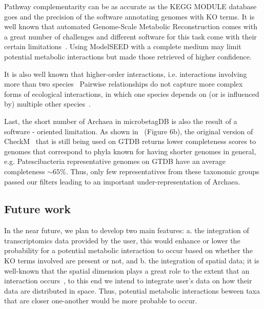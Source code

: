 \documentclass[sn-mathphys,Numbered]{sn-jnl}  %
\theoremstyle{thmstyleone}%
\theoremstyle{thmstyletwo}%
\theoremstyle{thmstylethree}%
\begin{document}
        Pathway complementarity can be as accurate as the KEGG MODULE database goes and the precision of the software annotating genomes with KO terms.
        It is well known that automated Genome-Scale Metabolic Reconstruction comes with a great number of challenges and different software for this task come with their certain limitations~\cite{mendoza2019systematic}. 
        Using ModelSEED with a complete medium may limit potential metabolic interactions but made those retrieved of higher confidence.

        It is also well known that higher-order interactions, i.e. interactions involving more than two species~\cite{zelezniak2015metabolic}
        Pairwise relationships do not capture more complex forms of ecological interactions, in which one species depends on (or is influenced by) multiple other species~\cite{faust2012microbialReviewInteractions}.

        Last, the short number of Archaea in microbetagDB is also the result of a software - oriented limitation.
        As shown in~\cite{chklovski2023checkm2} (Figure 6b), the original version of CheckM~\cite{parks2015checkm} that is still being used on GTDB returns lower completeness scores to genomes that correspond to phyla known for having shorter genomes in general, e.g. Patescibacteria representative genomes on GTDB have an average completeness $\sim 65\%$.
        Thus, only few representatives from these taxonomic groups passed our filters leading to an important under-representation of Archaea.




    \subsection*{Future work}
    \label{subsec:future}

        In the near future, we plan to develop two main features: 
        a. the integration of transcriptomics data provided by the user, this would enhance or lower the probability for a potential metabolic interaction to occur based on whether the KO terms involved are present or not, and 
        b. the integration of spatial data; it is well-known that the spatial dimension plays a great role to the extent that an interaction occurs~\cite{dal2020short}, to this end we intend to integrate user's data on how their data are distributed in space. 
        Thus, potential metabolic interactions beween taxa that are closer one-another would be more probable to occur.
\end{document}
